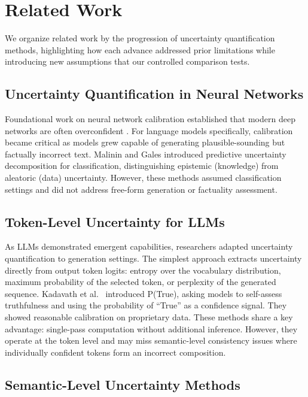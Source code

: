 \section{Related Work}
\label{sec:related}

We organize related work by the progression of uncertainty quantification methods, highlighting how each advance addressed prior limitations while introducing new assumptions that our controlled comparison tests.

\subsection{Uncertainty Quantification in Neural Networks}

Foundational work on neural network calibration established that modern deep networks are often overconfident \cite{guo2017calibration}. For language models specifically, calibration became critical as models grew capable of generating plausible-sounding but factually incorrect text. Malinin and Gales \cite{malinin2018predictive} introduced predictive uncertainty decomposition for classification, distinguishing epistemic (knowledge) from aleatoric (data) uncertainty. However, these methods assumed classification settings and did not address free-form generation or factuality assessment.

\subsection{Token-Level Uncertainty for LLMs}

As LLMs demonstrated emergent capabilities, researchers adapted uncertainty quantification to generation settings. The simplest approach extracts uncertainty directly from output token logits: entropy over the vocabulary distribution, maximum probability of the selected token, or perplexity of the generated sequence. Kadavath et al.\ \cite{kadavath2022language} introduced P(True), asking models to self-assess truthfulness and using the probability of ``True'' as a confidence signal. They showed reasonable calibration on proprietary data. These methods share a key advantage: single-pass computation without additional inference. However, they operate at the token level and may miss semantic-level consistency issues where individually confident tokens form an incorrect composition.

\subsection{Semantic-Level Uncertainty Methods}

